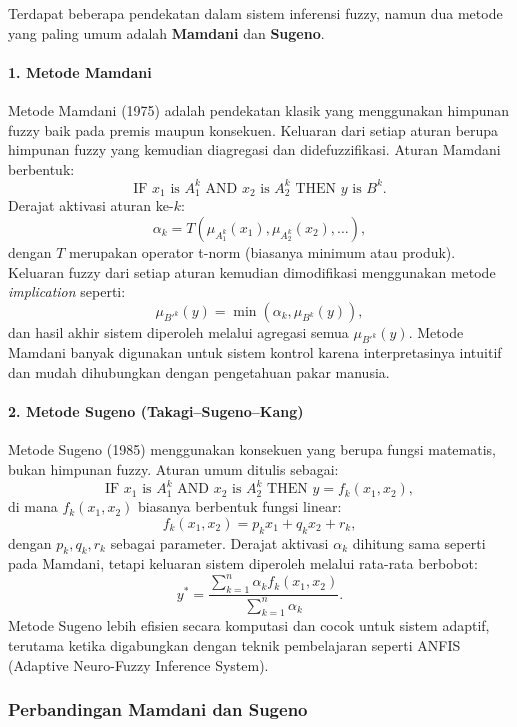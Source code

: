 \documentclass[12pt,a4paper]{article}
\theoremstyle{remark}
\begin{document}
Terdapat beberapa pendekatan dalam sistem inferensi fuzzy, namun dua metode yang paling umum adalah \textbf{Mamdani} dan \textbf{Sugeno}.

\paragraph{1. Metode Mamdani}
Metode Mamdani (1975) adalah pendekatan klasik yang menggunakan himpunan fuzzy baik pada premis maupun konsekuen. Keluaran dari setiap aturan berupa himpunan fuzzy yang kemudian diagregasi dan didefuzzifikasi.
Aturan Mamdani berbentuk:
\[
    \text{IF } x_1 \text{ is } A_1^k \text{ AND } x_2 \text{ is } A_2^k \text{ THEN } y \text{ is } B^k.
\]
Derajat aktivasi aturan ke-\(k\):
\[
    \alpha_k = T(\mu_{A_1^k}(x_1), \mu_{A_2^k}(x_2), \dots),
\]
dengan \(T\) merupakan operator t-norm (biasanya minimum atau produk).
Keluaran fuzzy dari setiap aturan kemudian dimodifikasi menggunakan metode \textit{implication} seperti:
\[
    \mu_{B'^k}(y) = \min(\alpha_k, \mu_{B^k}(y)),
\]
dan hasil akhir sistem diperoleh melalui agregasi semua \(\mu_{B'^k}(y)\).
Metode Mamdani banyak digunakan untuk sistem kontrol karena interpretasinya intuitif dan mudah dihubungkan dengan pengetahuan pakar manusia.

\paragraph{2. Metode Sugeno (Takagi–Sugeno–Kang)}
Metode Sugeno (1985) menggunakan konsekuen yang berupa fungsi matematis, bukan himpunan fuzzy. Aturan umum ditulis sebagai:
\[
    \text{IF } x_1 \text{ is } A_1^k \text{ AND } x_2 \text{ is } A_2^k \text{ THEN } y = f_k(x_1, x_2),
\]
di mana \(f_k(x_1, x_2)\) biasanya berbentuk fungsi linear:
\[
    f_k(x_1, x_2) = p_k x_1 + q_k x_2 + r_k,
\]
dengan \(p_k, q_k, r_k\) sebagai parameter.
Derajat aktivasi \(\alpha_k\) dihitung sama seperti pada Mamdani, tetapi keluaran sistem diperoleh melalui rata-rata berbobot:
\[
    y^* = \frac{\sum_{k=1}^n \alpha_k f_k(x_1, x_2)}{\sum_{k=1}^n \alpha_k}.
\]
Metode Sugeno lebih efisien secara komputasi dan cocok untuk sistem adaptif, terutama ketika digabungkan dengan teknik pembelajaran seperti ANFIS (Adaptive Neuro-Fuzzy Inference System).

\subsubsection{Perbandingan Mamdani dan Sugeno}
\end{document}
